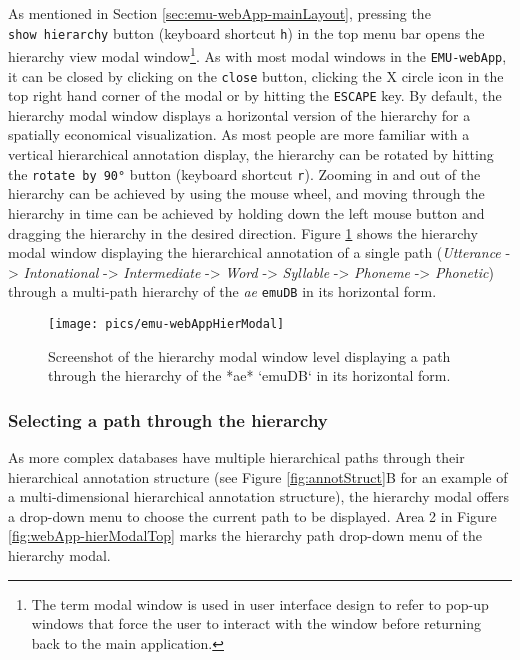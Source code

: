 \documentclass[
]{book}
\begin{document}
As mentioned in Section \ref{sec:emu-webApp-mainLayout}, pressing the \texttt{show\ hierarchy} button (keyboard shortcut \texttt{h}) in the top menu bar opens the hierarchy view modal window\footnote{The term modal window is used in user interface design to refer to pop-up windows that force the user to interact with the window before returning back to the main application.}. As with most modal windows in the \texttt{EMU-webApp}, it can be closed by clicking on the \texttt{close} button, clicking the X circle icon in the top right hand corner of the modal or by hitting the \texttt{ESCAPE} key. By default, the hierarchy modal window displays a horizontal version of the hierarchy for a spatially economical visualization. As most people are more familiar with a vertical hierarchical annotation display, the hierarchy can be rotated by hitting the \texttt{rotate\ by\ 90°} button (keyboard shortcut \texttt{r}). Zooming in and out of the hierarchy can be achieved by using the mouse wheel, and moving through the hierarchy in time can be achieved by holding down the left mouse button and dragging the hierarchy in the desired direction. Figure \ref{fig:webApp-hierModal} shows the hierarchy modal window displaying the hierarchical annotation of a single path (\emph{Utterance} -\textgreater{} \emph{Intonational} -\textgreater{} \emph{Intermediate} -\textgreater{} \emph{Word} -\textgreater{} \emph{Syllable} -\textgreater{} \emph{Phoneme} -\textgreater{} \emph{Phonetic}) through a multi-path hierarchy of the \emph{ae} \texttt{emuDB} in its horizontal form.

\begin{figure}

{\centering \texttt{[image: pics/emu-webAppHierModal]} 

}

\caption{Screenshot of the hierarchy modal window level displaying a path through the hierarchy of the *ae* `emuDB` in its horizontal form.}\label{fig:webApp-hierModal}
\end{figure}

\hypertarget{selecting-a-path-through-the-hierarchy}{%
\subsubsection*{Selecting a path through the hierarchy}\label{selecting-a-path-through-the-hierarchy}}

As more complex databases have multiple hierarchical paths through their hierarchical annotation structure (see Figure \ref{fig:annotStruct}B for an example of a multi-dimensional hierarchical annotation structure), the hierarchy modal offers a drop-down menu to choose the current path to be displayed. Area 2 in Figure \ref{fig:webApp-hierModalTop} marks the hierarchy path drop-down menu of the hierarchy modal.
\end{document}
